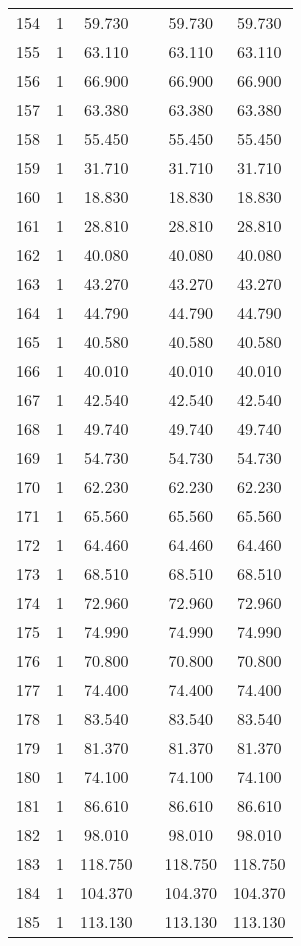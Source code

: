 \begin{table}[!htbp]
\begin{tabular}{@{\extracolsep{5pt}}lccccc}
154 & 1 & 59.730 &  & 59.730 & 59.730 \\ 
155 & 1 & 63.110 &  & 63.110 & 63.110 \\ 
156 & 1 & 66.900 &  & 66.900 & 66.900 \\ 
157 & 1 & 63.380 &  & 63.380 & 63.380 \\ 
158 & 1 & 55.450 &  & 55.450 & 55.450 \\ 
159 & 1 & 31.710 &  & 31.710 & 31.710 \\ 
160 & 1 & 18.830 &  & 18.830 & 18.830 \\ 
161 & 1 & 28.810 &  & 28.810 & 28.810 \\ 
162 & 1 & 40.080 &  & 40.080 & 40.080 \\ 
163 & 1 & 43.270 &  & 43.270 & 43.270 \\ 
164 & 1 & 44.790 &  & 44.790 & 44.790 \\ 
165 & 1 & 40.580 &  & 40.580 & 40.580 \\ 
166 & 1 & 40.010 &  & 40.010 & 40.010 \\ 
167 & 1 & 42.540 &  & 42.540 & 42.540 \\ 
168 & 1 & 49.740 &  & 49.740 & 49.740 \\ 
169 & 1 & 54.730 &  & 54.730 & 54.730 \\ 
170 & 1 & 62.230 &  & 62.230 & 62.230 \\ 
171 & 1 & 65.560 &  & 65.560 & 65.560 \\ 
172 & 1 & 64.460 &  & 64.460 & 64.460 \\ 
173 & 1 & 68.510 &  & 68.510 & 68.510 \\ 
174 & 1 & 72.960 &  & 72.960 & 72.960 \\ 
175 & 1 & 74.990 &  & 74.990 & 74.990 \\ 
176 & 1 & 70.800 &  & 70.800 & 70.800 \\ 
177 & 1 & 74.400 &  & 74.400 & 74.400 \\ 
178 & 1 & 83.540 &  & 83.540 & 83.540 \\ 
179 & 1 & 81.370 &  & 81.370 & 81.370 \\ 
180 & 1 & 74.100 &  & 74.100 & 74.100 \\ 
181 & 1 & 86.610 &  & 86.610 & 86.610 \\ 
182 & 1 & 98.010 &  & 98.010 & 98.010 \\ 
183 & 1 & 118.750 &  & 118.750 & 118.750 \\ 
184 & 1 & 104.370 &  & 104.370 & 104.370 \\ 
185 & 1 & 113.130 &  & 113.130 & 113.130 \\ 

\end{tabular}
\end{table}
